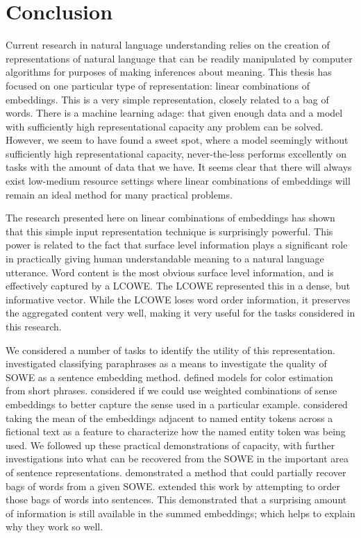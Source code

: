 \documentclass{book}
\begin{document}
\chapter{Conclusion}
Current research in natural language understanding relies on 
the creation of representations of natural language that can be readily manipulated by computer algorithms
for purposes of making inferences about meaning.
This thesis has focused on one particular type of representation:
linear combinations of embeddings.
This is a very simple representation, closely related to a bag of words.
There is a machine learning adage: that given enough data and a model with sufficiently high representational capacity any problem can be solved.
However, we seem to have found a sweet spot, 
where a model seemingly without sufficiently high representational capacity,
never-the-less performs excellently on tasks with the amount of data that we have.
It seems clear that there will always exist low-medium resource settings where linear combinations of embeddings will remain an ideal method for many practical problems.


The research presented here on linear combinations of embeddings has shown that this simple input representation technique is surprisingly powerful.
This  power is related to the fact that surface level information plays a significant role in practically giving human understandable meaning to a natural language utterance.
Word content is the most obvious surface level information, and is effectively captured by a LCOWE.
The LCOWE represented this in a dense, but informative vector.
While the LCOWE loses word order information, it preserves the aggregated content very well,
making it very useful for the tasks considered in this research.


We considered a number of tasks to identify the utility of this representation.
 investigated classifying paraphrases as a means to investigate the quality of SOWE as a sentence embedding method.
 defined models for color estimation from short phrases.
 considered if we could use weighted combinations of sense embeddings to better capture the sense used in a particular example.
 considered taking the mean of the embeddings adjacent to named entity tokens across a fictional text as a feature to characterize how the named entity token was being used.
We followed up these practical demonstrations of capacity,
with further investigations into what can be recovered from the SOWE in the important area of sentence representations.
 demonstrated a method that could partially recover bags of words from a given SOWE.
 extended this work by attempting to order those bags of words into sentences.
This demonstrated that a surprising amount of information is still available in the summed embeddings; which helps to explain why they work so well.
\end{document}
